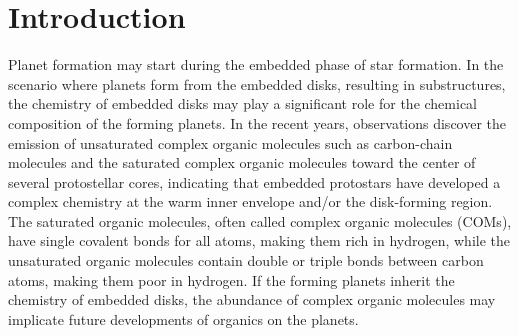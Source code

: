 \documentclass[twocolumn]{aastex62}
\newcommand{\methylformate}{\mbox{HCOOCH$_{3}$}}
\newcommand{\methanol}{\mbox{CH$_{3}$OH}}
\newcommand{\dimethylether}{\mbox{CH$_{3}$OCH$_{3}$}}
\newcommand{\methylcyanide}{\mbox{CH$_{3}$CN}}
\begin{document}
\begin{abstract}
  Complex organic molecules (COMs) at the protostellar phase constrain the chemistry at the warm inner envelope as well as the disk-forming region, which may affect the chemical composition of disks and the planet formation therein.  This study introduces the PEACHES survey, an unbiased ALMA chemistry survey toward the Class 0/I protostars in the Perseus molecular cloud and characterize the statistics of the abundance complex organic molecules.  Among the 50 embedded protostars surveyed, 58\%\ have emission of COMs with 56\%\ have \methanol, 32\%\ have \methylformate, and 40\% have N-bearing COMs.  The column densities of COMs modeled with LTE radiative transfer calculations correlate with each other.  Protostellar properties, such as the bolometric luminosities and the bolometric temperatures, have insignificant impact on the correlations.  The similar chemistry of COMs among a diverse sample hints a universal chemistry of COMs at the embedded phase of star formation.  At the same time, the abundance of more complex species, such as \methylformate\ and \dimethylether, relative to that of less complex species, such as \methanol\ and \methylcyanide, increases as the inferred gas column density, suggesting a more efficient production of more complex species at more embedded sources. 
\end{abstract}
\keywords{}

\section{Introduction}


Planet formation may start during the embedded phase of star formation.  In the scenario where planets form from the embedded disks, resulting in substructures, the chemistry of embedded disks may play a significant role for the chemical composition of the forming planets.  In the recent years, observations discover the emission of unsaturated complex organic molecules such as carbon-chain molecules \citep[e.g., ][]{2013ChRv..113.8981S,2014Natur.507...78S,2018ApJ...863...88L} and the saturated complex organic molecules \citep[e.g., ][and the ALMA PILS Survey]{2003ApJ...593L..51C,2007AA...463..601B,2016AA...595A.117J} toward the center of several protostellar cores, indicating that embedded protostars have developed a complex chemistry at the warm inner envelope and/or the disk-forming region.  The saturated organic molecules, often called complex organic molecules (COMs), have single covalent bonds for all atoms, making them rich in hydrogen, while the unsaturated organic molecules contain double or triple bonds between carbon atoms, making them poor in hydrogen.  If the forming planets inherit the chemistry of embedded disks, the abundance of complex organic molecules may implicate future developments of organics on the planets. 
\end{document}
